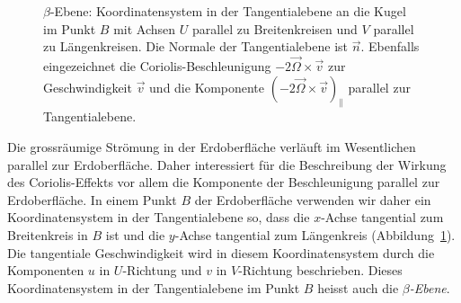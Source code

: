 \begin{figure}
\centering
{}
\caption{$\beta$-Ebene: Koordinatensystem in der Tangentialebene an die Kugel
im Punkt $B$ mit Achsen $U$ parallel zu Breitenkreisen und $V$ parallel
zu Längenkreisen.
Die Normale der Tangentialebene ist $\vec{n}$.
Ebenfalls eingezeichnet die Coriolis-Beschleunigung
$-2\vec{\Omega}\times\vec{v}$ zur Geschwindigkeit $\vec{v}$ und
die Komponente $(-2\vec{\Omega}\times\vec{v})_{\|}$ parallel
zur Tangentialebene.
\label{skript:betaplane}}
\end{figure}
Die grossräumige Strömung in der Erdoberfläche verläuft im Wesentlichen 
parallel zur Erdoberfläche.
Daher interessiert für die Beschreibung der Wirkung des Coriolis-Effekts
vor allem die Komponente der Beschleunigung parallel zur Erdoberfläche.
In einem Punkt $B$ der Erdoberfläche verwenden wir daher ein
Koordinatensystem in der Tangentialebene so, dass die $x$-Achse tangential
zum Breitenkreis in $B$ ist und die $y$-Achse tangential zum Längenkreis
(Abbildung~\ref{skript:betaplane}).
Die tangentiale Geschwindigkeit wird in diesem Koordinatensystem durch die
Komponenten $u$ in $U$-Richtung und $v$ in $V$-Richtung beschrieben.
Dieses Koordinatensystem in der Tangentialebene im Punkt $B$ heisst auch
die {\em $\beta$-Ebene}.
\label{skript:betaplane:definition}

